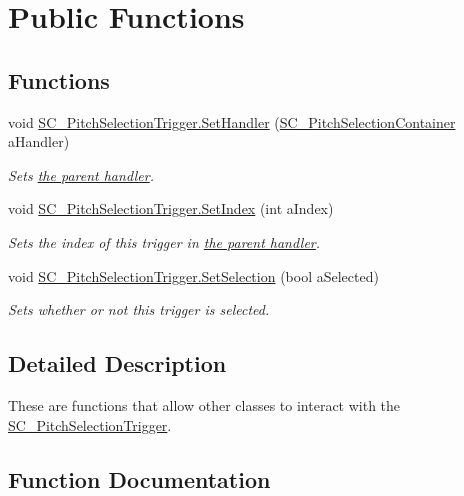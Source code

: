 \hypertarget{group___s_c___p_s_t_pub_func}{}\section{Public Functions}
\label{group___s_c___p_s_t_pub_func}
\subsection*{Functions}
\begin{DoxyCompactItemize}
\item 
void \hyperlink{group___s_c___p_s_t_pub_func_ga0b334518dbdac5874adf9436cd2c7fed}{S\+C\+\_\+\+Pitch\+Selection\+Trigger.\+Set\+Handler} (\hyperlink{class_s_c___pitch_selection_container}{S\+C\+\_\+\+Pitch\+Selection\+Container} a\+Handler)
\begin{DoxyCompactList}\small\item\em Sets \hyperlink{group___doc_s_c___p_s_c}{the parent handler}. \end{DoxyCompactList}\item 
void \hyperlink{group___s_c___p_s_t_pub_func_ga0b4edbf9719a384aa5cf8d29d1065696}{S\+C\+\_\+\+Pitch\+Selection\+Trigger.\+Set\+Index} (int a\+Index)
\begin{DoxyCompactList}\small\item\em Sets the index of this trigger in \hyperlink{group___doc_s_c___p_s_c}{the parent handler}. \end{DoxyCompactList}\item 
void \hyperlink{group___s_c___p_s_t_pub_func_ga267db9aed38ba33ad44c26c84a1757df}{S\+C\+\_\+\+Pitch\+Selection\+Trigger.\+Set\+Selection} (bool a\+Selected)
\begin{DoxyCompactList}\small\item\em Sets whether or not this trigger is selected. \end{DoxyCompactList}\end{DoxyCompactItemize}


\subsection{Detailed Description}
These are functions that allow other classes to interact with the \hyperlink{class_s_c___pitch_selection_trigger}{S\+C\+\_\+\+Pitch\+Selection\+Trigger}. 

\subsection{Function Documentation}
\mbox{\label{group___s_c___p_s_t_pub_func_ga0b334518dbdac5874adf9436cd2c7fed}} 
